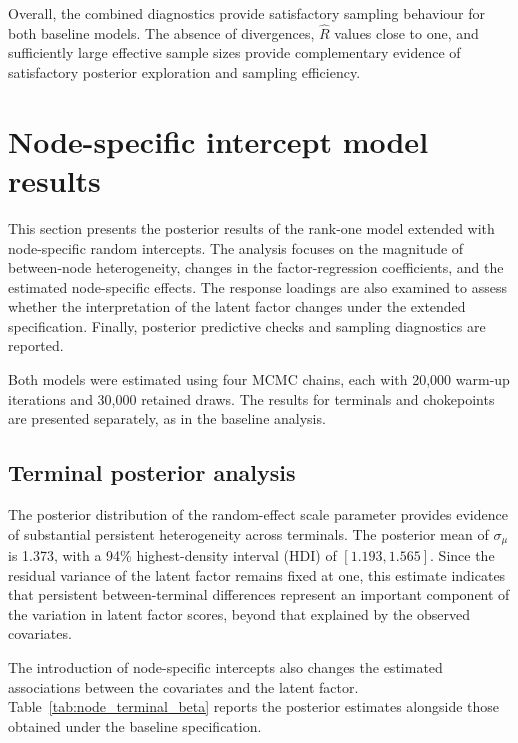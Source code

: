 \documentclass[pdftex,12pt,openright,a4paper,oneside]{book}
\begin{document}
Overall, the combined diagnostics provide
satisfactory sampling behaviour for both
baseline models.
The absence of divergences, $\widehat{R}$
values close to one, and sufficiently large
effective sample sizes provide complementary
evidence of satisfactory posterior exploration
and sampling efficiency.

\section{Node-specific intercept model results}
\label{sec:node_specific_model}

This section presents the posterior results of the
rank-one model extended with node-specific random
intercepts.
The analysis focuses on the magnitude of
between-node heterogeneity, changes in the
factor-regression coefficients, and the estimated
node-specific effects. The response loadings are
also examined to assess whether the interpretation
of the latent factor changes under the extended
specification. Finally, posterior predictive checks
and sampling diagnostics are reported.

Both models were estimated using four MCMC chains,
each with 20,000 warm-up iterations and 30,000
retained draws. The results for terminals and
chokepoints are presented separately, as in the baseline analysis.

\subsection{Terminal posterior analysis}
\label{subsec:node_terminal_results}

The posterior distribution of the random-effect
scale parameter provides evidence of substantial
persistent heterogeneity across terminals.
The posterior mean of $\sigma_\mu$ is 1.373,
with a 94\% highest-density interval (HDI) of
$[1.193,1.565]$.
Since the residual variance of the latent factor
remains fixed at one, this estimate indicates
that persistent between-terminal differences
represent an important component of the
variation in latent factor scores, beyond
that explained by the observed covariates.

The introduction of node-specific intercepts
also changes the estimated associations between
the covariates and the latent factor.
Table~\ref{tab:node_terminal_beta} reports
the posterior estimates alongside those
obtained under the baseline specification.
\end{document}
